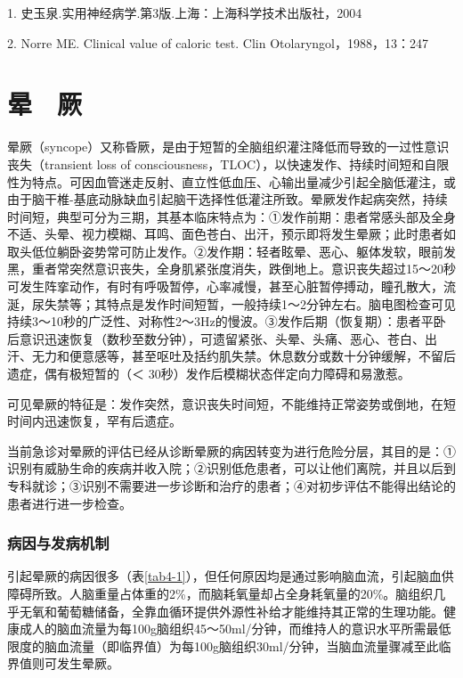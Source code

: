 1. 史玉泉.实用神经病学.第3版.上海：上海科学技术出版社，2004

2. Norre ME. Clinical value of caloric test. Clin
Otolaryngol，1988，13：247

\protect\hypertarget{text00014.html}{}{}

\chapter{晕　厥}

晕厥（syncope）又称昏厥，是由于短暂的全脑组织灌注降低而导致的一过性意识丧失（transient
loss of
consciousness，TLOC），以快速发作、持续时间短和自限性为特点。可因血管迷走反射、直立性低血压、心输出量减少引起全脑低灌注，或由于脑干椎-基底动脉缺血引起脑干选择性低灌注所致。晕厥发作起病突然，持续时间短，典型可分为三期，其基本临床特点为：①发作前期：患者常感头部及全身不适、头晕、视力模糊、耳鸣、面色苍白、出汗，预示即将发生晕厥；此时患者如取头低位躺卧姿势常可防止发作。②发作期：轻者眩晕、恶心、躯体发软，眼前发黑，重者常突然意识丧失，全身肌紧张度消失，跌倒地上。意识丧失超过15～20秒可发生阵挛动作，有时有呼吸暂停，心率减慢，甚至心脏暂停搏动，瞳孔散大，流涎，尿失禁等；其特点是发作时间短暂，一般持续1～2分钟左右。脑电图检查可见持续3～10秒的广泛性、对称性2～3Hz的慢波。③发作后期（恢复期）：患者平卧后意识迅速恢复（数秒至数分钟），可遗留紧张、头晕、头痛、恶心、苍白、出汗、无力和便意感等，甚至呕吐及括约肌失禁。休息数分或数十分钟缓解，不留后遗症，偶有极短暂的（＜
30秒）发作后模糊状态伴定向力障碍和易激惹。

可见晕厥的特征是：发作突然，意识丧失时间短，不能维持正常姿势或倒地，在短时间内迅速恢复，罕有后遗症。

当前急诊对晕厥的评估已经从诊断晕厥的病因转变为进行危险分层，其目的是：①识别有威胁生命的疾病并收入院；②识别低危患者，可以让他们离院，并且以后到专科就诊；③识别不需要进一步诊断和治疗的患者；④对初步评估不能得出结论的患者进行进一步检查。

\subsection{病因与发病机制}

引起晕厥的病因很多（表\ref{tab4-1}），但任何原因均是通过影响脑血流，引起脑血供障碍所致。人脑重量占体重的2\%，而脑耗氧量却占全身耗氧量的20\%。脑组织几乎无氧和葡萄糖储备，全靠血循环提供外源性补给才能维持其正常的生理功能。健康成人的脑血流量为每100g脑组织45～50ml/分钟，而维持人的意识水平所需最低限度的脑血流量（即临界值）为每100g脑组织30ml/分钟，当脑血流量骤减至此临界值则可发生晕厥。

